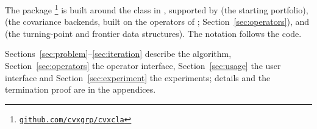 The package \citep{cvxcla}\footnote{\href{\repourl}{\texttt{github.com/cvxgrp/cvxcla}}}
is built around the class  in ,
supported by  (the starting portfolio),
 (the covariance backends, built on
the operators of  \citep{cvxlinalg}; Section~\ref{sec:operators}), and
 (the turning-point and frontier data
structures). The notation follows the code.

Sections~\ref{sec:problem}--\ref{sec:iteration} describe the algorithm,
Section~\ref{sec:operators} the operator interface, Section~\ref{sec:usage} the user interface and
Section~\ref{sec:experiment} the experiments; details and the termination proof are in the
appendices.
